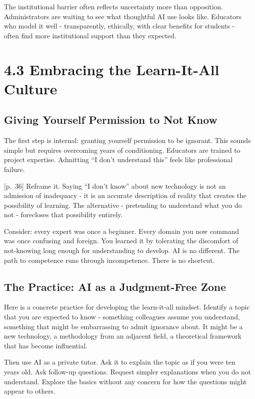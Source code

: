 \documentclass[
  letterpaper,
  DIV=11,
  numbers=noendperiod]{scrreprt}
\begin{document}
The institutional barrier often reflects uncertainty more than
opposition. Administrators are waiting to see what thoughtful AI use
looks like. Educators who model it well - transparently, ethically, with
clear benefits for students - often find more institutional support than
they expected.

\section{4.3 Embracing the Learn-It-All
Culture}\label{embracing-the-learn-it-all-culture}

\subsection{Giving Yourself Permission to Not
Know}\label{giving-yourself-permission-to-not-know}

The first step is internal: granting yourself permission to be ignorant.
This sounds simple but requires overcoming years of conditioning.
Educators are trained to project expertise. Admitting ``I don't
understand this'' feels like professional failure.

{[}p.~36{]} Reframe it. Saying ``I don't know'' about new technology is
not an admission of inadequacy - it is an accurate description of
reality that creates the possibility of learning. The alternative -
pretending to understand what you do not - forecloses that possibility
entirely.

Consider: every expert was once a beginner. Every domain you now command
was once confusing and foreign. You learned it by tolerating the
discomfort of not-knowing long enough for understanding to develop. AI
is no different. The path to competence runs through incompetence. There
is no shortcut.

\subsection{The Practice: AI as a Judgment-Free
Zone}\label{the-practice-ai-as-a-judgment-free-zone}

Here is a concrete practice for developing the learn-it-all mindset.
Identify a topic that you are expected to know - something colleagues
assume you understand, something that might be embarrassing to admit
ignorance about. It might be a new technology, a methodology from an
adjacent field, a theoretical framework that has become influential.

Then use AI as a private tutor. Ask it to explain the topic as if you
were ten years old. Ask follow-up questions. Request simpler
explanations when you do not understand. Explore the basics without any
concern for how the questions might appear to others.
\end{document}

